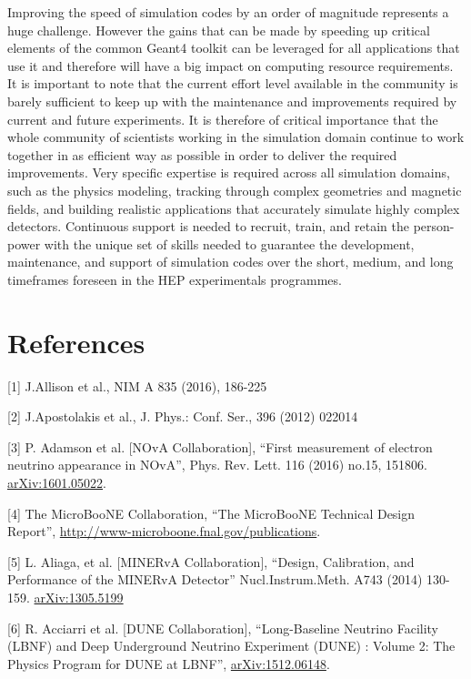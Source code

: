 \documentclass[12pt,a4paper]{article}
\begin{document}
Improving the speed of simulation codes by an order of magnitude
represents a huge challenge. However the gains that can be made by
speeding up critical elements of the common Geant4 toolkit can be
leveraged for all applications that use it and therefore will have a big
impact on computing resource requirements. It is important to note that
the current effort level available in the community is barely sufficient
to keep up with the maintenance and improvements required by current and
future experiments. It is therefore of critical importance that the
whole community of scientists working in the simulation domain continue
to work together in as efficient way as possible in order to deliver the
required improvements. Very specific expertise is required across all
simulation domains, such as the physics modeling, tracking through
complex geometries and magnetic fields, and building realistic
applications that accurately simulate highly complex detectors.
Continuous support is needed to recruit, train, and retain the
person-power with the unique set of skills needed to guarantee the
development, maintenance, and support of simulation codes over the
short, medium, and long timeframes foreseen in the HEP experimentals
programmes.

\hypertarget{references}{%
\section{References}\label{references}}

{[}1{]} J.Allison et al., NIM A 835 (2016), 186-225

{[}2{]} J.Apostolakis et al., J. Phys.: Conf. Ser., 396 (2012) 022014

{[}3{]} P. Adamson et al. {[}NOvA Collaboration{]}, ``First measurement
of electron neutrino appearance in NOvA'', Phys. Rev. Lett. 116 (2016)
no.15, 151806.
\href{https://arxiv.org/abs/1601.05022}{{arXiv:1601.05022}}.

{[}4{]} The MicroBooNE Collaboration, ``The MicroBooNE Technical Design
Report'',
\href{http://www-microboone.fnal.gov/publications}{{http://www-microboone.fnal.gov/publications}}.

{[}5{]} L. Aliaga, et al. {[}MINERvA Collaboration{]}, ``Design,
Calibration, and Performance of the MINERvA Detector''
Nucl.Instrum.Meth. A743 (2014) 130-159.
\href{https://arxiv.org/abs/1305.5199}{{arXiv:1305.5199}}

{[}6{]} R. Acciarri et al. {[}DUNE Collaboration{]}, ``Long-Baseline
Neutrino Facility (LBNF) and Deep Underground Neutrino Experiment (DUNE)
: Volume 2: The Physics Program for DUNE at LBNF'',
\href{https://arxiv.org/abs/1512.06148}{{arXiv:1512.06148}}.
\end{document}
